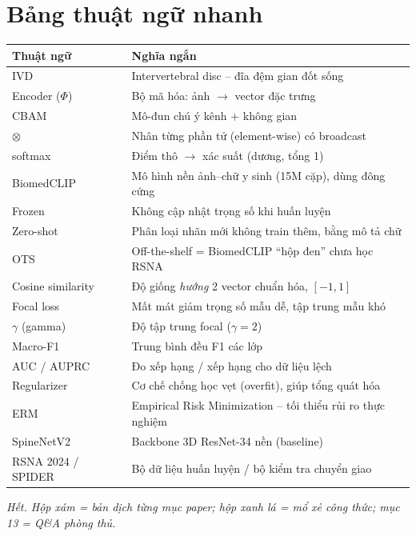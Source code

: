 \documentclass[12pt,a4paper]{article}
\begin{document}
\section{Bảng thuật ngữ nhanh}
\begin{center}\small
\begin{tabular}{p{3.2cm}p{11cm}}
\toprule
Thuật ngữ & Nghĩa ngắn \\
\midrule
IVD & Intervertebral disc -- đĩa đệm gian đốt sống \\
Encoder ($\Phi$) & Bộ mã hóa: ảnh $\to$ vector đặc trưng \\
CBAM & Mô-đun chú ý kênh + không gian \\
$\otimes$ & Nhân từng phần tử (element-wise) có broadcast \\
softmax & Điểm thô $\to$ xác suất (dương, tổng 1) \\
BiomedCLIP & Mô hình nền ảnh--chữ y sinh (15M cặp), dùng đông cứng \\
Frozen & Không cập nhật trọng số khi huấn luyện \\
Zero-shot & Phân loại nhãn mới không train thêm, bằng mô tả chữ \\
OTS & Off-the-shelf = BiomedCLIP ``hộp đen'' chưa học RSNA \\
Cosine similarity & Độ giống \emph{hướng} 2 vector chuẩn hóa, $[-1,1]$ \\
Focal loss & Mất mát giảm trọng số mẫu dễ, tập trung mẫu khó \\
$\gamma$ (gamma) & Độ tập trung focal ($\gamma=2$) \\
Macro-F1 & Trung bình đều F1 các lớp \\
AUC / AUPRC & Đo xếp hạng / xếp hạng cho dữ liệu lệch \\
Regularizer & Cơ chế chống học vẹt (overfit), giúp tổng quát hóa \\
ERM & Empirical Risk Minimization -- tối thiểu rủi ro thực nghiệm \\
SpineNetV2 & Backbone 3D ResNet-34 nền (baseline) \\
RSNA 2024 / SPIDER & Bộ dữ liệu huấn luyện / bộ kiểm tra chuyển giao \\
\bottomrule
\end{tabular}
\end{center}

\vspace{1em}
\begin{center}\itshape\small
Hết. Hộp xám = bản dịch từng mục paper; hộp xanh lá = mổ xẻ công thức; mục 13 = Q\&A phòng thủ.
\end{center}
\end{document}
